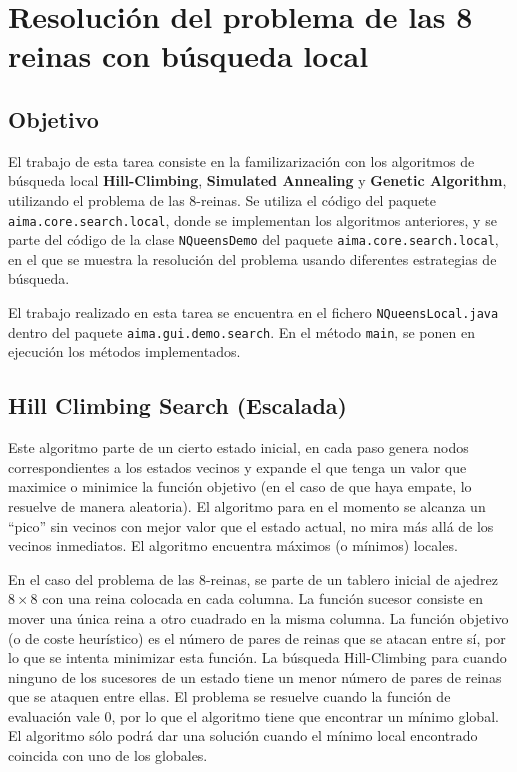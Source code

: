 \documentclass[..main.tex]{subfiles}
\begin{document}
\chapter{Resolución del problema de las 8 reinas con búsqueda local}

\section{Objetivo} 

El trabajo de esta tarea consiste en la familizarización con los algoritmos de búsqueda local \textbf{Hill-Climbing}, \textbf{Simulated Annealing} y \textbf{Genetic Algorithm}, utilizando el problema de las 8-reinas. Se utiliza el código del paquete \texttt{aima.core.search.local}, donde se implementan los algoritmos anteriores, y se parte del código de la clase \texttt{NQueensDemo} del paquete \texttt{aima.core.search.local}, en el que se muestra la resolución del problema usando diferentes estrategias de búsqueda.

El trabajo realizado en esta tarea se encuentra en el fichero \texttt{NQueensLocal.java} dentro del paquete \texttt{aima.gui.demo.search}. En el método \texttt{main}, se ponen en ejecución los métodos implementados.

\section{Hill Climbing Search (Escalada)}
Este algoritmo parte de un cierto estado inicial, en cada paso genera nodos correspondientes a los estados vecinos y expande el que tenga un valor que maximice o minimice la función objetivo (en el caso de que haya empate, lo resuelve de manera aleatoria). El algoritmo para en el momento se alcanza un ``pico'' sin vecinos con mejor valor que el estado actual, no mira más allá de los vecinos inmediatos. El algoritmo encuentra máximos (o mínimos) locales.

En el caso del problema de las 8-reinas, se parte de un tablero inicial de ajedrez $8\times8$ con una reina colocada en cada columna. La función sucesor consiste en mover una única reina a otro cuadrado en la misma columna. La función objetivo (o de coste heurístico) es el número de pares de reinas que se atacan entre sí, por lo que se intenta minimizar esta función. La búsqueda Hill-Climbing para cuando ninguno de los sucesores de un estado tiene un menor número de pares de reinas que se ataquen entre ellas. El problema se resuelve cuando la función de evaluación vale 0, por lo que el algoritmo tiene que encontrar un mínimo global. El algoritmo sólo podrá dar una solución cuando el mínimo local encontrado coincida con uno de los globales.
\end{document}
